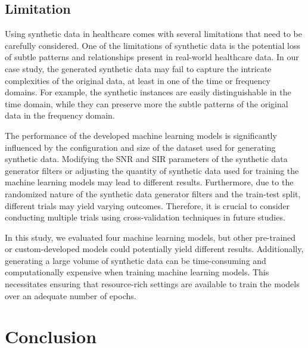 \documentclass{article}
\begin{document}
\subsection{Limitation}
Using synthetic data in healthcare comes with several limitations that need to be carefully considered. One of the limitations of synthetic data is the potential loss of subtle patterns and relationships present in real-world healthcare data. In our case study, the generated synthetic data may fail to capture the intricate complexities of the original data, at least in one of the time or frequency domains. For example, the synthetic instances are easily distinguishable in the time domain, while they can preserve more the subtle patterns of the original data in the frequency domain.

\par The performance of the developed machine learning models is significantly influenced by the configuration and size of the dataset used for generating synthetic data. Modifying the SNR and SIR parameters of the synthetic data generator filters or adjusting the quantity of synthetic data used for training the machine learning models may lead to different results. Furthermore, due to the randomized nature of the synthetic data generator filters and the train-test split, different trials may yield varying outcomes. Therefore, it is crucial to consider conducting multiple trials using cross-validation techniques in future studies.

\par In this study, we evaluated four machine learning models, but other pre-trained or custom-developed models could potentially yield different results. Additionally, generating a large volume of synthetic data can be time-consuming and computationally expensive when training machine learning models. This necessitates ensuring that resource-rich settings are available to train the models over an adequate number of epochs.


\section{Conclusion}




\end{document}
